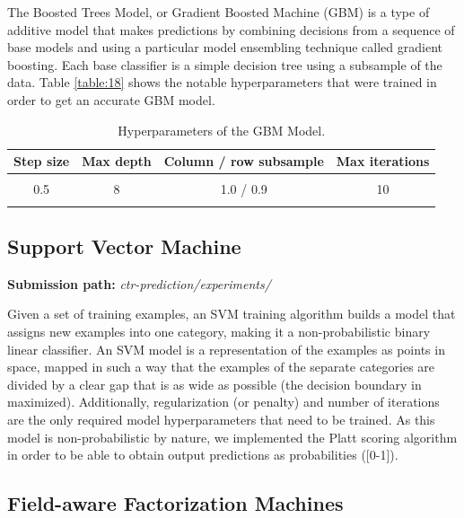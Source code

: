 \documentclass{article} %
\begin{document}
The Boosted Trees Model, or Gradient Boosted Machine (GBM) is a type of additive model that makes predictions by combining decisions from a sequence of base models and using a particular model ensembling technique called gradient boosting. Each base classifier is a simple decision tree using a subsample of the data. Table \ref{table:18} shows the notable hyperparameters that were trained in order to get an accurate GBM model. 

\begin{table}[!htbp]
\caption{Hyperparameters of the GBM Model.}
\label{table:18}
\begin{center}
\begin{tabular}{c c c c}
\multicolumn{1}{c}{\bf Step size} & \multicolumn{1}{c}{\bf Max depth} & \multicolumn{1}{c}{\bf Column / row subsample} & \multicolumn{1}{c}{\bf Max iterations}
\\ \hline \\
{0.5} & {8} & {1.0 / 0.9} & {10}\\
\label{}
\end{tabular}
\end{center}
\end{table}

\subsection{Support Vector Machine}

\textbf{Submission path:} \textit{ctr-prediction/experiments/}

Given a set of training examples, an SVM training algorithm builds a model that assigns new examples into one category, making it a non-probabilistic binary linear classifier. An SVM model is a representation of the examples as points in space, mapped in such a way that the examples of the separate categories are divided by a clear gap that is as wide as possible (the decision boundary in maximized). Additionally, regularization (or penalty) and number of iterations are the only required model hyperparameters that need to be trained. As this model is non-probabilistic by nature, we implemented the Platt scoring algorithm \cite{platt1999probabilistic} in order to be able to obtain output predictions as probabilities ([0-1]).

\subsection{Field-aware Factorization Machines}
\end{document}

